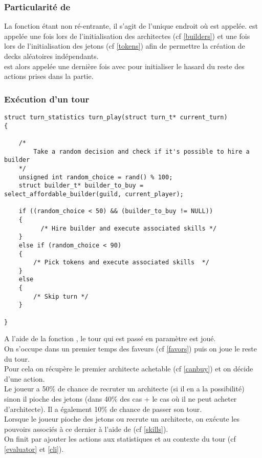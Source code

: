 \subsubsection*{Particularité de }
La fonction  étant non ré-entrante, il s'agit de l'unique endroit où  est appelée.  est appelée une fois lors de l'initialisation des architectes (cf \ref{builders}) et une fois lors de l'initialisation des jetons (cf \ref{tokens}) afin de permettre la création de decks aléatoires indépendants. \\
 est alors appelée une dernière fois avec  pour initialiser le hasard du reste des actions prises dans la partie.

\subsubsection{Exécution d'un tour}

\begin{lstlisting}[frame=single, caption={Implémentation de l'exécution d'un tour}]
struct turn_statistics turn_play(struct turn_t* current_turn)
{

	/*
        Take a random decision and check if it's possible to hire a builder
	*/
	unsigned int random_choice = rand() % 100; 
	struct builder_t* builder_to_buy = select_affordable_builder(guild, current_player);

	if ((random_choice < 50) && (builder_to_buy != NULL)) 
	{
		  /* Hire builder and execute associated skills */ 
	}
	else if (random_choice < 90)
	{
		/* Pick tokens and execute associated skills  */
	}
	else 
	{
		/* Skip turn */
	}

}
\end{lstlisting}
A l'aide de la fonction , le tour qui est passé en paramètre est joué.\\
On s'occupe dans un premier temps des faveurs (cf \ref{favors}) puis on joue le reste du tour.\\
Pour cela on récupère le premier architecte achetable (cf \ref{canbuy}) et on décide d'une action. \\Le joueur a 50$\%$ de chance de recruter un architecte (si il en a la possibilité) sinon il pioche des jetons (dans 40$\%$ des cas + le cas où il ne peut acheter d'architecte). Il a également 10$\%$ de chance de passer son tour. \\
Lorsque le joueur pioche des jetons ou recrute un architecte, on exécute les pouvoirs associés à ce dernier à l'aide de  (cf \ref{skills}).\\
On finit par ajouter les actions aux statistiques et au contexte du tour (cf \ref{evaluator} et \ref{cli}).


